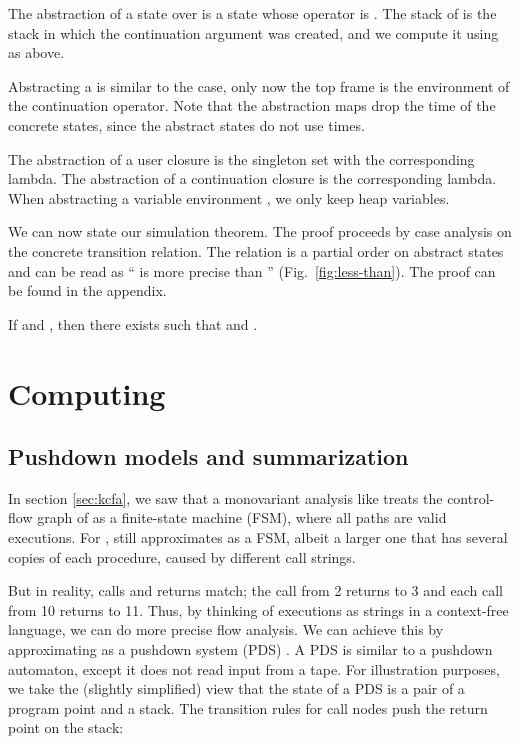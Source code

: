 \documentclass{LMCS}
\theoremstyle{definition} \newtheorem{property}[thm]{Property}
\begin{document}
The abstraction of a \duapply{} state over \tuple{\denot{\ulam}, \cbenv} 
is a \dauapply{} state \astat{} whose operator is \denot{\ulam}.
The stack of \astat{} is the stack in which the continuation 
argument was created, and we compute it using \tostackNA{} as above.

Abstracting a \dcapply{} is similar to the \duapply{} case,
only now the top frame is the environment of the continuation operator.
Note that the abstraction maps drop the time of the concrete states,
since the abstract states do not use times.

The abstraction of a user closure is the singleton set with the 
corresponding lambda.
The abstraction of a continuation closure is the corresponding lambda.
When abstracting a variable environment \cvenv, we only keep heap variables.

We can now state our simulation theorem.
The proof proceeds by case analysis on the concrete transition relation.
The relation  is a partial order on abstract 
states and can be read as ``\astato{} is more precise than \astatw'' 
(Fig.~\ref{fig:less-than}).
The proof can be found in the appendix.
\begin{thm}[Simulation] 
If  and , then 
there exists  such that 
and .
\end{thm}


\section{Computing \cfat\label{sec:summarization}}

\subsection{Pushdown models and summarization}

In section \ref{sec:kcfa}, we saw that a monovariant analysis like 
treats the control-flow graph of  as a finite-state machine (FSM),
where all paths are valid executions.
For , \kcfa{} still approximates  as a FSM, albeit a larger one
that has several copies of each procedure, caused by different call strings.

But in reality, calls and returns match; the call from 2 returns to 3 and each
call from 10 returns to 11.
Thus, by thinking of executions as strings in a context-free language, we can do
more precise flow analysis.
We can achieve this by approximating  as a pushdown system (PDS)
\cite{journal/entcs/97/finkel/pds, conf/concur/97/bouajjani/pds}.
A PDS is similar to a pushdown automaton, except it does not read input from a
tape.
For illustration purposes, we take the (slightly simplified) view that the state
of a PDS is a pair of a program point and a stack.
The transition rules for call nodes push the return point on the stack:
\end{document}
